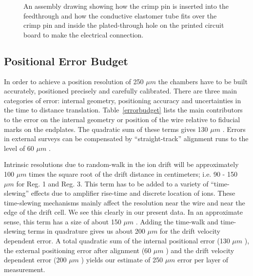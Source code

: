\documentclass[12pt]{article}
\def\microns{$\mu m $ }
\begin{document}
\begin{figure}[htbp]
\vspace{8.0cm}
\caption{\small{An assembly drawing showing how the crimp pin is inserted
into the feedthrough and how the conductive elastomer tube fits over
the crimp pin and inside the plated-through hole on the printed
circuit board to make the electrical connection.}}
\label{crimp}
\end{figure}

\subsection{Positional Error Budget}

In order to achieve a position resolution of 250 \microns
the chambers have to be built accurately, positioned precisely
and carefully calibrated.   There are three main categories
of error: internal geometry, positioning accuracy and uncertainties
in the time to distance translation.
Table~\ref{errorbudget} lists the main contributors
to the error on the internal geometry or position of the wire relative
to fiducial marks on the endplates.  The quadratic sum of these
terms gives 130 \microns.
Errors in external surveys can
be compensated by ``straight-track'' alignment runs to the level of
60 \microns.  

Intrinsic resolutions due to random-walk in the
ion drift will be approximately 100 \microns times the square root
of the drift distance in centimeters; i.e. 90 - 150 \microns for 
Reg. 1 and Reg. 3.  This term has to be added to a variety of
``time-slewing'' effects due to amplifier rise-time and discrete
location of ions.  These time-slewing mechanisms mainly affect
the resolution near the wire and near the edge of the drift 
cell.  We see this clearly in our present data.  In an approximate
sense, this term has a size of about 150 \microns.
Adding the time-walk and time-slewing terms in quadrature gives
us about 200 \microns for the drift velocity dependent error.
A total quadratic sum of the internal positional error (130 \microns),
the external positioning error after alignment (60 \microns) and
the drift velocity dependent error (200 \microns) yields our
estimate of 250 \microns error per layer of measurement.   
\end{document}

